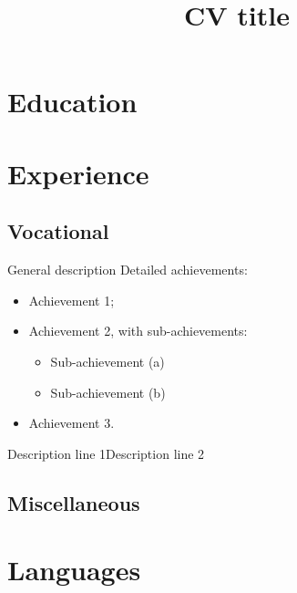 \documentclass[11pt,a4paper,sans,demo]{moderncv}%
\title{CV title}
\begin{document}
\makecvtitle
\section{Education}
\section{Experience}
\subsection{Vocational}
  {General description\newline{}%
Detailed achievements:%
\begin{itemize}%
\item Achievement 1;
\item Achievement 2, with sub-achievements:
  \begin{itemize}%
  \item Sub-achievement (a)
  \item Sub-achievement (b)
  \end{itemize}
\item Achievement 3.
\end{itemize}}
  {Description line 1\newline{}Description line 2}
\subsection{Miscellaneous}
\section{Languages}
\end{document}
